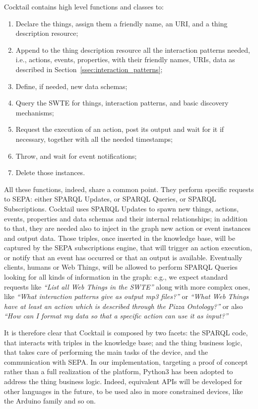 Cocktail contains high level functions and classes to:
\begin{enumerate}
    \item Declare the things, assign them a friendly name, an URI, and a thing description resource;
    \item Append to the thing description resource all the interaction patterns needed, i.e., actions, events, properties, with their friendly names, URIs, data as described in Section~\ref{ssec:interaction_patterns};
    \item Define, if needed, new data schemas;
    \item Query the SWTE for things, interaction patterns, and basic discovery mechanisms;
    \item Request the execution of an action, post its output and wait for it if necessary, together with all the needed timestamps;
    \item Throw, and wait for event notifications;
    \item Delete those instances.
\end{enumerate}

All these functions, indeed, share a common point. They perform specific requests to SEPA: either SPARQL Updates, or SPARQL Queries, or SPARQL Subscriptions. Cocktail uses SPARQL Updates to spawn new things, actions, events, properties and data schemas and their internal relationships; in addition to that, they are needed also to inject in the graph new action or event instances and output data. Those triples, once inserted in the knowledge base, will be captured by the SEPA subscriptions engine, that will trigger an action execution, or notify that an event has occurred or that an output is available. Eventually clients, humans or Web Things, will be allowed to perform SPARQL Queries looking for all kinds of information in the graph: e.g., we expect standard requests like \textit{``List all Web Things in the SWTE''} along with more complex ones, like \textit{``What interaction patterns give as output mp3 files?''} or \textit{``What Web Things have at least an action which is described through the Pizza Ontology?''} or also \textit{``How can I format my data so that a specific action can use it as input?''}

It is therefore clear that Cocktail is composed by two facets: the SPARQL code, that interacts with triples in the knowledge base; and the thing business logic, that takes care of performing the main tasks of the device, and the communication with SEPA. In our implementation, targeting a proof of concept rather than a full realization of the platform, Python3 has been adopted to address the thing business logic. Indeed, equivalent APIs will be developed for other languages in the future, to be used also in more constrained devices, like the Arduino family and so on. 

